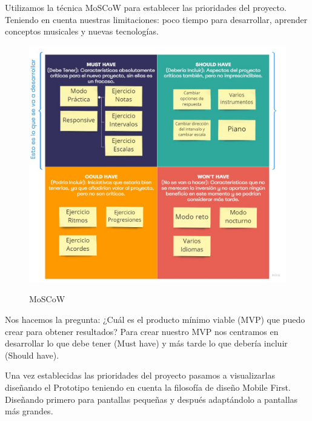 \documentclass[12pt,twoside,titlepage]{report}
\begin{document}
Utilizamos la técnica MoSCoW para establecer las prioridades del proyecto. Teniendo en cuenta nuestras limitaciones: poco tiempo para desarrollar, aprender conceptos musicales y nuevas tecnologías. 

\begin{figure}[H]
    \centering
    \includegraphics[scale=0.35]{Design Thinking/MosCow}
    \label{fig:MoSCoW}
    \caption{MoSCoW}
\end{figure}

Nos hacemos la pregunta: ¿Cuál es el producto mínimo viable (MVP) que puedo crear para obtener resultados? Para crear nuestro MVP nos centramos en desarrollar lo que debe tener (Must have) y más tarde lo que debería incluir (Should have).

Una vez establecidas las prioridades del proyecto pasamos a visualizarlas diseñando el Prototipo teniendo en cuenta la filosofía de diseño Mobile First. Diseñando primero para pantallas pequeñas y después adaptándolo a pantallas más grandes.
    
\end{document}
